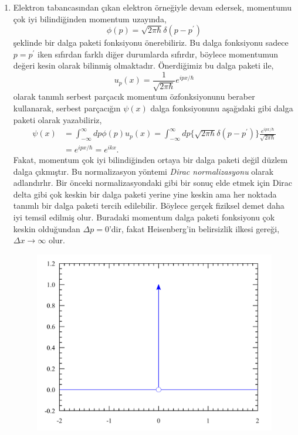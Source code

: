 \documentclass[a4paper,12pt, twoside]{article}
\begin{document}
\begin{enumerate}
	
	\item Elektron tabancasından çıkan elektron örneğiyle devam edersek, momentumu çok iyi bilindiğinden momentum uzayında,
	\begin{equation}
	\phi ( p ) = \sqrt { 2 \pi \hbar } \delta ( p - p^\prime )
	\end{equation}
	şeklinde bir dalga paketi fonksiyonu önerebiliriz. Bu dalga fonksiyonu sadece $p=p^\prime$ iken sıfırdan farklı diğer durumlarda sıfırdır, böylece momentumun değeri kesin olarak bilinmiş olmaktadır.
	Önerdiğimiz bu dalga paketi ile,
	\begin{equation}
	u _ { p } ( x ) = \frac { 1 } { \sqrt { 2 \pi \hbar } } e ^ { i p x / \hbar }
	\label{eq:free_particle_wf}
	\end{equation}
	olarak tanımlı serbest parçacık momentum özfonksiyonunu beraber kullanarak, serbest parçacığın $\psi(x)$ dalga fonksiyonunu aşağıdaki gibi dalga paketi olarak yazabiliriz,
	\begin{align}
	\psi ( x )  
	&= \int _ { - \infty } ^ { \infty } d p \phi ( p ) u_p(x)
	= \int _ { - \infty } ^ { \infty } d p  \{\sqrt { 2 \pi \hbar } \delta ( p - p^\prime )\} \frac { e ^ { i p x /\hbar } } { \sqrt { 2 \pi \hbar } }\\
	&= e ^ { i p x /\hbar } =  e ^ { i k x }.
	\end{align}
Fakat, momentum çok iyi bilindiğinden ortaya bir dalga paketi değil düzlem dalga çıkmıştır. Bu normalizasyon yöntemi \emph{Dirac normalizasyonu} olarak adlandırlır. Bir önceki normalizasyondaki gibi bir sonuç elde etmek için Dirac delta gibi çok keskin bir dalga paketi yerine yine keskin ama her noktada tanımlı bir dalga paketi tercih edilebilir. Böylece gerçek fiziksel demet daha iyi temsil edilmiş olur. Buradaki momentum dalga paketi fonksiyonu çok keskin olduğundan $\Delta p = 0$'dir, fakat Heisenberg'in belirsizlik ilkesi gereği, $\Delta x \rightarrow \infty$ olur.
	\begin{figure}[hbtp]	
	\begin{minipage}{.45\textwidth}
	\centering
	\includegraphics[width=.9\linewidth]{Dirac_distribution_PDF.pdf}

\end{minipage}
\end{figure}
\end{enumerate}
\end{document}
